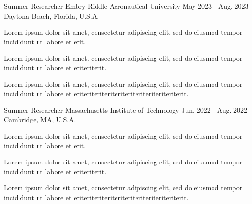 
\begin{cventries}
  \cventry
    {Summer Researcher} %
    {Embry-Riddle Aeronautical University} %
    {May 2023 - Aug. 2023} %
    {Daytona Beach, Florida, U.S.A.} %
    {
      \begin{cvitems} %
        \item {Lorem ipsum dolor sit amet, consectetur adipiscing elit, sed do eiusmod tempor incididunt ut labore et erit.}
        \item {Lorem ipsum dolor sit amet, consectetur adipiscing elit, sed do eiusmod tempor incididunt ut labore et eriteriterit.}
        \item {Lorem ipsum dolor sit amet, consectetur adipiscing elit, sed do eiusmod tempor incididunt ut labore et eriteriteriteriteriteriteriteriteriteriterit.}
      \end{cvitems}
    }
\end{cventries}

\begin{cventries}
  \cventry
    {Summer Researcher} %
    {Massachusetts Institute of Technology} %
    {Jun. 2022 - Aug. 2022} %
    {Cambridge, MA, U.S.A.} %
    {
      \begin{cvitems} %
        \item {Lorem ipsum dolor sit amet, consectetur adipiscing elit, sed do eiusmod tempor incididunt ut labore et erit.}
        \item {Lorem ipsum dolor sit amet, consectetur adipiscing elit, sed do eiusmod tempor incididunt ut labore et eriteriterit.}
        \item {Lorem ipsum dolor sit amet, consectetur adipiscing elit, sed do eiusmod tempor incididunt ut labore et eriteriteriteriteriteriteriteriteriteriterit.}
      \end{cvitems}
    }

\end{cventries}
